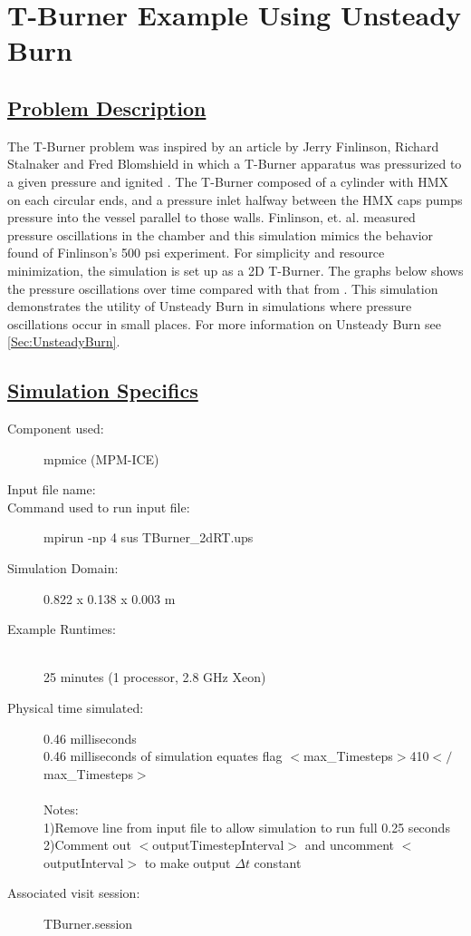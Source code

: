 \newpage
%
\newpage
\section*{\center  T-Burner Example Using Unsteady Burn}
\subsection*{\underline{Problem Description}}
The T-Burner problem was inspired by  an article by Jerry Finlinson, Richard Stalnaker and Fred Blomshield in which a T-Burner apparatus was pressurized to a given pressure and ignited \cite{ref:finlinson1}.  The T-Burner composed of a cylinder with HMX on each circular ends, and a pressure inlet halfway between the HMX caps pumps pressure into the vessel parallel to those walls.  Finlinson, et. al. measured pressure oscillations in the chamber and this simulation mimics the behavior found of Finlinson's 500 psi experiment.  For simplicity and resource minimization, the simulation is set up as a 2D T-Burner.  The graphs below shows the pressure oscillations over time compared with that from \cite{ref:finlinson1}.  This simulation demonstrates the utility of Unsteady Burn in simulations where pressure oscillations occur in small places.  For more information on Unsteady Burn see \ref{Sec:UnsteadyBurn}.

\subsection*{\underline{Simulation Specifics}}
\begin{description}
\item [Component used:] \hfill mpmice (MPM-ICE)
\item [Input file name:] \hfill {}
\item [Command used to run input file:]\hfill mpirun -np 4 sus TBurner\_2dRT.ups

\item [Simulation Domain:]\hfill    0.822 x 0.138 x 0.003 m

\item [Example Runtimes:] \hfill \\
 25 minutes   (1 processor, 2.8 GHz Xeon)\\

\item [Physical time simulated:] \hfill 0.46 milliseconds \\ 
0.46 milliseconds of simulation equates flag $<$max\_Timesteps$>$410$</$max\_Timesteps$>$ \\ \\
Notes: \\
1)Remove line from input file to allow simulation to run full 0.25 seconds \\
2)Comment out $<$outputTimestepInterval$>$ and uncomment $<$outputInterval$>$ to make output $\Delta t$ constant \\ 

\item [Associated visit session:] \hfill TBurner.session

\end{description}

